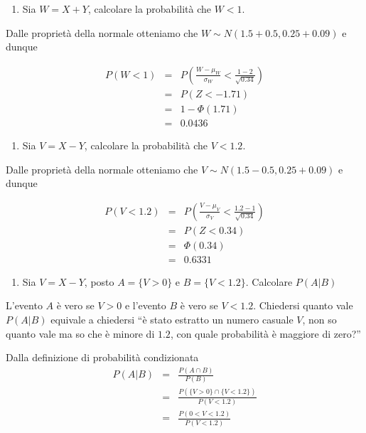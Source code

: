 \documentclass[
  11pt,
]{book}
\providecommand{\tightlist}{%
  \setlength{\itemsep}{0pt}\setlength{\parskip}{0pt}}
\theoremstyle{mytheoremstyle}
\theoremstyle{mydefstyle}
\begin{document}
\begin{enumerate}
\def\labelenumi{\arabic{enumi}.}
\setcounter{enumi}{11}
\tightlist
\item
  Sia \(W=X+Y\), calcolare la probabilità che \(W<1\).
\end{enumerate}

Dalle proprietà della normale otteniamo che \(W\sim N(1.5+0.5,0.25+0.09)\) e dunque

\begin{eqnarray*}
      P( W   <   1 ) 
        &=& P\left(  \frac { W  -  \mu_W }{ \sigma_W }  <  \frac { 1  -  2 }{\sqrt{ 0.34 }} \right)  \\
                 &=& P\left(  Z   <   -1.71 \right) \\    
                 &=&  1-\Phi( 1.71 ) \\ &=&  0.0436 
      \end{eqnarray*}

\begin{enumerate}
\def\labelenumi{\arabic{enumi}.}
\setcounter{enumi}{12}
\tightlist
\item
  Sia \(V=X-Y\), calcolare la probabilità che \(V<1.2\).
\end{enumerate}

Dalle proprietà della normale otteniamo che \(V\sim N(1.5-0.5,0.25+0.09)\) e dunque

\begin{eqnarray*}
      P( V   <   1.2 ) 
        &=& P\left(  \frac { V  -  \mu_V }{ \sigma_V }  <  \frac { 1.2  -  1 }{\sqrt{ 0.34 }} \right)  \\
                 &=& P\left(  Z   <   0.34 \right) \\    
                 &=&  \Phi( 0.34 ) \\ &=&  0.6331 
      \end{eqnarray*}

\begin{enumerate}
\def\labelenumi{\arabic{enumi}.}
\setcounter{enumi}{13}
\tightlist
\item
  Sia \(V=X-Y\), posto \(A=\{V>0\}\) e \(B=\{V<1.2\}\). Calcolare \(P(A|B)\)
\end{enumerate}

L'evento \(A\) è vero se \(V>0\) e l'evento \(B\) è vero se \(V<1.2\). Chiedersi quanto vale
\(P(A|B)\) equivale a chiedersi ``è stato estratto un numero casuale \(V\), non so quanto vale
ma so che è minore di \(1.2\), con quale probabilità è maggiore di zero?''

Dalla definizione di probabilità condizionata
\begin{eqnarray*}
   P(A|B)&=&\frac{P(A\cap B)}{P(B)}\\
   &=&\frac{P(\{V>0\}\cap \{V<1.2\})}{P(V<1.2)}\\
   &=&\frac{P(0<V<1.2)}{P(V<1.2)}
\end{eqnarray*}
\end{document}
